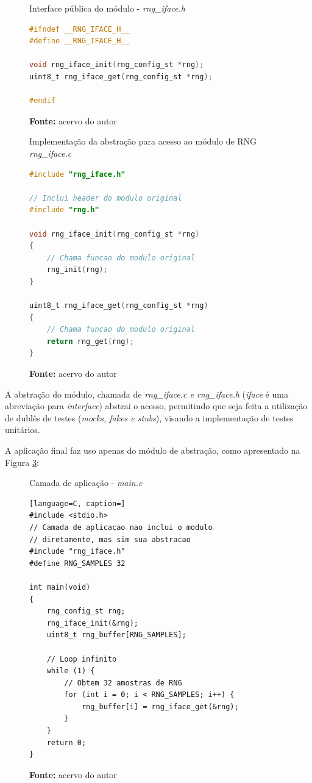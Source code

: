 \documentclass[times, twoside, watermark]{artigo}
\begin{document}
\begin{figure}[H]
  \centering
  \caption{Interface pública do módulo - \textit{rng\_iface.h}}
\begin{lstlisting}[language=C]
#ifndef __RNG_IFACE_H__
#define __RNG_IFACE_H__

void rng_iface_init(rng_config_st *rng);
uint8_t rng_iface_get(rng_config_st *rng);

#endif
\end{lstlisting}
  \label{fig:rng_iface.h}
  \caption*{\newline\textbf{Fonte:} acervo do autor}
\end{figure}

\begin{figure}[H]
  \centering
  \caption{Implementação da abstração para acesso ao módulo de RNG
\textit{rng\_iface.c}}
\begin{lstlisting}[language=C]
#include "rng_iface.h"

// Inclui header do modulo original
#include "rng.h"

void rng_iface_init(rng_config_st *rng)
{
    // Chama funcao do modulo original
    rng_init(rng);
}

uint8_t rng_iface_get(rng_config_st *rng)
{
    // Chama funcao do modulo original
    return rng_get(rng);
}

\end{lstlisting}
  \label{fig:rng_iface.c}
  \caption*{\newline\textbf{Fonte:} acervo do autor}
\end{figure}

A abstração do módulo, chamada de \textit{rng\_iface.c e rng\_iface.h}
(\textit{iface} é uma abreviação para \textit{interface}) abstrai o
acesso, permitindo que seja feita a utilização de dublês de testes (\textit{mocks,
  fakes e stubs}), visando a implementação de testes unitários.

A aplicação final faz uso apenas do módulo de abstração, como apresentado na Figura 
\ref{fig:main.c}:\hfill\\

\begin{figure}[H]
  \centering
  \caption{Camada de aplicação - \textit{main.c}}
\begin{lstlisting}[language=C, caption=]
#include <stdio.h>
// Camada de aplicacao nao inclui o modulo
// diretamente, mas sim sua abstracao
#include "rng_iface.h"
#define RNG_SAMPLES 32

int main(void)
{	
	rng_config_st rng;
	rng_iface_init(&rng);
	uint8_t rng_buffer[RNG_SAMPLES];
    
	// Loop infinito
	while (1) {
		// Obtem 32 amostras de RNG
		for (int i = 0; i < RNG_SAMPLES; i++) {
			rng_buffer[i] = rng_iface_get(&rng);
		}
	}
    return 0;
}
\end{lstlisting}
  \label{fig:main.c}
  \caption*{\newline\textbf{Fonte:} acervo do autor}
\end{figure}
\end{document}
